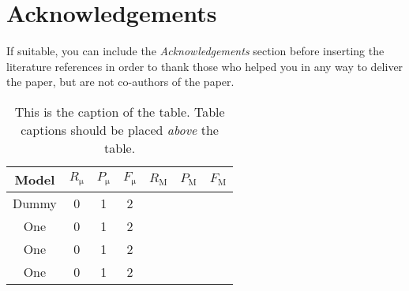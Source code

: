 \documentclass[10pt, a4paper]{article}
\begin{document}
\section*{Acknowledgements}

If suitable, you can include the \textit{Acknowledgements} section before inserting the literature references  in order to thank those who helped you in any way to deliver the paper, but are not co-authors of the paper.

\begin{table}
	\caption{This is the caption of the table. Table captions should be placed \textit{above} the table.}
	\label{tab:narrow-table}
	\begin{center}
		\begin{tabular}{c|ccc|ccc}
			\toprule
			Model & $R_\mathrm{\mu}$ & $P_\mathrm{\mu}$ & $F_\mathrm{\mu}$ & $R_\mathrm{M}$ & $P_\mathrm{M}$ & $F_\mathrm{M}$\\
			\midrule
			Dummy & 0 & 1 & 2 \\
			One & 0 & 1 & 2 \\
			One & 0 & 1 & 2 \\
			\midrule
			One & 0 & 1 & 2 \\
			\bottomrule
		\end{tabular}
	\end{center}
\end{table}



\end{document}
